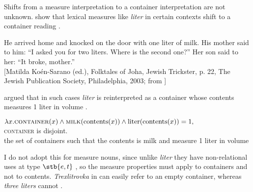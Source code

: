 \documentclass[output=paper]{langscibook}
\begin{document}
\noindent Shifts from a measure interpretation to a container interpretation are not unknown. \citet{Khrizman.etal2015} show that lexical measures like \textit{liter} in certain contexts shift to a container reading .

\ea\label{ex:khrizmann:24} He arrived home and knocked on the door with one liter of milk. His mother said to him: ``I asked you for two liters. Where is the second one?'' Her son said to her: ``It broke, mother.'' \\
{\small [Matilda Koén-Sarano (ed.), Folktales of Joha, Jewish Trickster, p. 22, The Jewish Publication Society, Philadelphia, 2003; from \citealt[200]{Khrizman.etal2015}]}
\z

\noindent \citet{Khrizman.etal2015} argued that in such cases \textit{liter} is reinterpreted as a container whose contents measures 1 liter in volume .

\ea\label{ex:khrizmann:25} $\lambda x. \textsc{container}(x) \wedge \textsc{milk}(\textnormal{contents}(x)) \wedge \textnormal{liter}(\textnormal{contents}(x)) = 1,$\\
{\small \textsc{container} is disjoint.\\
the set of containers such that the contents is milk and measure 1 liter in volume}
\z

\noindent I do not adopt this for measure nouns, since unlike \textit{liter} they have non-relational uses at type $\stb{e,t}$ , so the measure properties must apply to containers and not to contents. \textit{Trexlitrovka} in  can easily refer to an empty container, whereas \textit{three liters} cannot .

\ea\label{ex:khrizmann:26}
\z\z
\end{document}
